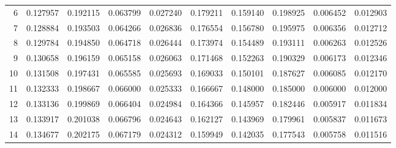 \documentclass[lettersize,journal]{IEEEtran}
\begin{document}
\begin{table}[ht!]
\begin{center}
\begin{tabular}{r|l|l|l|l|l|l|l|l|l}
      6              & 0.127957                              & 0.192115           & 0.063799                                & 0.027240                             & 0.179211           & 0.159140           & 0.198925           & 0.006452          & 0.012903      \\
      7              & 0.128884                              & 0.193503           & 0.064266                                & 0.026836                             & 0.176554           & 0.156780           & 0.195975           & 0.006356          & 0.012712      \\
      8              & 0.129784                              & 0.194850           & 0.064718                                & 0.026444                             & 0.173974           & 0.154489           & 0.193111           & 0.006263          & 0.012526      \\
      9              & 0.130658                              & 0.196159           & 0.065158                                & 0.026063                             & 0.171468           & 0.152263           & 0.190329           & 0.006173          & 0.012346      \\
      10             & 0.131508                              & 0.197431           & 0.065585                                & 0.025693                             & 0.169033           & 0.150101           & 0.187627           & 0.006085          & 0.012170      \\
      11             & 0.132333                              & 0.198667           & 0.066000                                & 0.025333                             & 0.166667           & 0.148000           & 0.185000           & 0.006000          & 0.012000      \\
      12             & 0.133136                              & 0.199869           & 0.066404                                & 0.024984                             & 0.164366           & 0.145957           & 0.182446           & 0.005917          & 0.011834      \\
      13             & 0.133917                              & 0.201038           & 0.066796                                & 0.024643                             & 0.162127           & 0.143969           & 0.179961           & 0.005837          & 0.011673      \\
      14             & 0.134677                              & 0.202175           & 0.067179                                & 0.024312                             & 0.159949           & 0.142035           & 0.177543           & 0.005758          & 0.011516      \\

\end{tabular}
\end{center}
\end{table}
\end{document}
